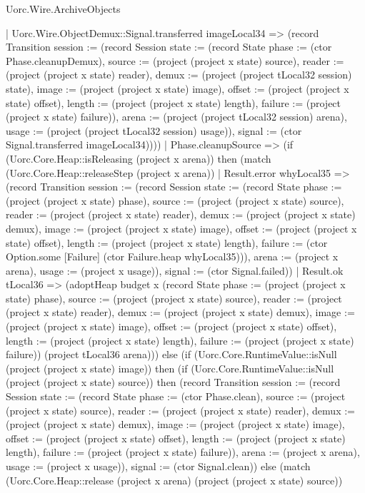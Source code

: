 \begin{lexlean}{Uorc.Wire.ArchiveObjects}
\begin{semanticmodule}
{      | Uorc.Wire.ObjectDemux::Signal.transferred imageLocal34 => (record Transition {session := (record Session {state := (record State {phase := (ctor Phase.cleanupDemux), source := (project (project x state) source), reader := (project (project x state) reader), demux := (project (project tLocal32 session) state), image := (project (project x state) image), offset := (project (project x state) offset), length := (project (project x state) length), failure := (project (project x state) failure)}), arena := (project (project tLocal32 session) arena), usage := (project (project tLocal32 session) usage)}), signal := (ctor Signal.transferred imageLocal34)})))
    | Phase.cleanupSource => (if (Uorc.Core.Heap::isReleasing (project x arena)) then (match (Uorc.Core.Heap::releaseStep (project x arena))
      | Result.error whyLocal35 => (record Transition {session := (record Session {state := (record State {phase := (project (project x state) phase), source := (project (project x state) source), reader := (project (project x state) reader), demux := (project (project x state) demux), image := (project (project x state) image), offset := (project (project x state) offset), length := (project (project x state) length), failure := (ctor Option.some [Failure] (ctor Failure.heap whyLocal35))}), arena := (project x arena), usage := (project x usage)}), signal := (ctor Signal.failed)})
      | Result.ok tLocal36 => (adoptHeap budget x (record State {phase := (project (project x state) phase), source := (project (project x state) source), reader := (project (project x state) reader), demux := (project (project x state) demux), image := (project (project x state) image), offset := (project (project x state) offset), length := (project (project x state) length), failure := (project (project x state) failure)}) (project tLocal36 arena))) else (if (Uorc.Core.RuntimeValue::isNull (project (project x state) image)) then (if (Uorc.Core.RuntimeValue::isNull (project (project x state) source)) then (record Transition {session := (record Session {state := (record State {phase := (ctor Phase.clean), source := (project (project x state) source), reader := (project (project x state) reader), demux := (project (project x state) demux), image := (project (project x state) image), offset := (project (project x state) offset), length := (project (project x state) length), failure := (project (project x state) failure)}), arena := (project x arena), usage := (project x usage)}), signal := (ctor Signal.clean)}) else (match (Uorc.Core.Heap::release (project x arena) (project (project x state) source))
}
\end{semanticmodule}
\end{lexlean}
